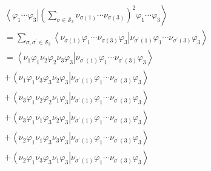 \documentclass[aps,preprint]{revtex4}%
\begin{document}
\begin{align*}
&  \left\langle \varphi_{1}\cdots\varphi_{3}\right\vert \left.  \left(
{\textstyle\sum\limits_{\sigma\in\mathcal{S}_{3}}}
\nu_{\sigma\left(  1\right)  }\cdots\nu_{\sigma\left(  3\right)  }\right)
^{2}\varphi_{1}\cdots\varphi_{3}\right\rangle \\
&  =%
{\textstyle\sum\limits_{\sigma,\sigma^{\prime}\in\mathcal{S}_{3}}}
\left\langle \nu_{\sigma\left(  1\right)  }\varphi_{1}\cdots\nu_{\sigma\left(
3\right)  }\varphi_{3}\right\vert \left.  \nu_{\sigma^{\prime}\left(
1\right)  }\varphi_{1}\cdots\nu_{\sigma^{\prime}\left(  3\right)  }\varphi
_{3}\right\rangle \\
&  =\left\langle \nu_{1}\varphi_{1}\nu_{2}\varphi_{2}\nu_{3}\varphi
_{3}\right\vert \left.  \nu_{\sigma^{\prime}\left(  1\right)  }\varphi
_{1}\cdots\nu_{\sigma^{\prime}\left(  3\right)  }\varphi_{3}\right\rangle \\
&  +\left\langle \nu_{1}\varphi_{1}\nu_{3}\varphi_{3}\nu_{2}\varphi
_{3}\right\vert \left.  \nu_{\sigma^{\prime}\left(  1\right)  }\varphi
_{1}\cdots\nu_{\sigma^{\prime}\left(  3\right)  }\varphi_{3}\right\rangle \\
&  +\left\langle \nu_{3}\varphi_{1}\nu_{2}\varphi_{2}\nu_{1}\varphi
_{3}\right\vert \left.  \nu_{\sigma^{\prime}\left(  1\right)  }\varphi
_{1}\cdots\nu_{\sigma^{\prime}\left(  3\right)  }\varphi_{3}\right\rangle \\
&  +\left\langle \nu_{3}\varphi_{1}\nu_{1}\varphi_{3}\nu_{2}\varphi
_{3}\right\vert \left.  \nu_{\sigma^{\prime}\left(  1\right)  }\varphi
_{1}\cdots\nu_{\sigma^{\prime}\left(  3\right)  }\varphi_{3}\right\rangle \\
&  +\left\langle \nu_{2}\varphi_{1}\nu_{1}\varphi_{3}\nu_{3}\varphi
_{3}\right\vert \left.  \nu_{\sigma^{\prime}\left(  1\right)  }\varphi
_{1}\cdots\nu_{\sigma^{\prime}\left(  3\right)  }\varphi_{3}\right\rangle \\
&  +\left\langle \nu_{2}\varphi_{1}\nu_{3}\varphi_{3}\nu_{1}\varphi
_{3}\right\vert \left.  \nu_{\sigma^{\prime}\left(  1\right)  }\varphi
_{1}\cdots\nu_{\sigma^{\prime}\left(  3\right)  }\varphi_{3}\right\rangle
\end{align*}%
\end{document}
